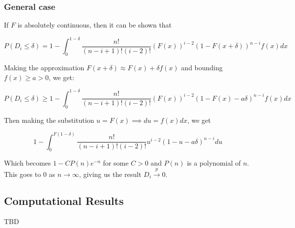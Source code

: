 \documentclass[
  11pt,
]{article}
\begin{document}
\hypertarget{general-case}{%
\subsubsection{General case}\label{general-case}}

If \(F\) is absolutely continuous, then it can be shown that

\[P(D_i \leq \delta) = 1 - \int_0^{1-\delta} \frac{n!}{(n-i+1)! (i-2)!} (F(x))^{i-2} (1 - F(x + \delta))^{n-i} f(x) dx\]

Making the approximation \(F(x+\delta) \approx F(x) + \delta f(x)\) and
bounding \(f(x) \geq a > 0\), we get:

\[P(D_i \leq \delta) \geq 1 - \int_0^{1-\delta} \frac{n!}{(n-i+1)! (i-2)!} (F(x))^{i-2} (1 - F(x) - a \delta)^{n-i} f(x) dx\]

Then making the substitution \(u = F(x) \implies du = f(x) dx\), we get

\[1 - \int_0^{F(1-\delta)} \frac{n!}{(n-i+1)! (i-2)!} u^{i-2} (1 - u - a \delta)^{n-i} du\]

Which becomes \(1 - C P(n) e^{-n}\) for some \(C > 0\) and \(P(n)\) is a
polynomial of \(n\). This goes to 0 as \(n \to \infty\), giving us the
result \(D_i \stackrel{p}{\to} 0\).

\hypertarget{computational-results}{%
\subsection{Computational Results}\label{computational-results}}

TBD

  
\end{document}
